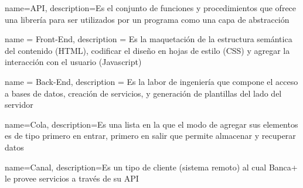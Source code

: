 {
  name=API,
  description={Es el conjunto de funciones y procedimientos que ofrece una librería para ser utilizados por un programa como una capa de abstracción}
}

{
	name = Front-End,
	description = {Es la maquetación de la estructura semántica del contenido (HTML), codificar el diseño en hojas de estilo (CSS) y agregar la interacción con el usuario (Javascript)}
}

{
	name = Back-End,
	description = {Es la labor de ingeniería que compone el acceso a bases de datos, creación de servicios, y generación de plantillas del lado del servidor}
}

{
  name=Cola,
  description={Es una lista en la que el modo de agregar sus elementos es de tipo 
	primero en entrar, primero en salir que permite almacenar y recuperar datos}
}

{
  name=Canal,
  description={Es un tipo de cliente (sistema remoto) al cual Banca+ le provee servicios a través de su API}
}
